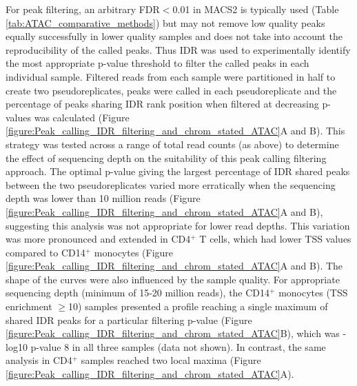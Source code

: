 For peak filtering, an arbitrary FDR$<$0.01 in MACS2 is typically used (Table \ref{tab:ATAC_comparative_methods}) but may not remove low quality peaks equally successfully in lower quality samples and does not take into account the reproducibility of the called peaks. Thus IDR was used to experimentally identify the most appropriate p-value threshold to filter the called peaks in each individual sample. Filtered reads from each sample were partitioned in half to create two pseudoreplicates, peaks were called in each pseudoreplicate and the percentage of peaks sharing IDR rank position when filtered at decreasing p-values was calculated (Figure \ref{figure:Peak_calling_IDR_filtering_and_chrom_stated_ATAC}A and B). This strategy was tested across a range of total read counts (as above) to determine the effect of sequencing depth on the suitability of this peak calling filtering approach. The optimal p-value giving the largest percentage of IDR shared peaks between the two pseudoreplicates varied more erratically when the sequencing depth was lower than 10 million reads (Figure \ref{figure:Peak_calling_IDR_filtering_and_chrom_stated_ATAC}A and B), suggesting this analysis was not appropriate for lower read depths. This variation was more pronounced and extended in CD4$^+$ T cells, which had lower TSS values compared to CD14$^+$ monocytes (Figure \ref{figure:Peak_calling_IDR_filtering_and_chrom_stated_ATAC}A and B). The shape of the curves were also influenced by the sample quality. For appropriate sequencing depth (minimum of 15-20 million reads), the CD14$^+$ monocytes (TSS enrichment $\geq$10) samples presented a profile reaching a single maximum of shared IDR peaks for a particular filtering p-value (Figure \ref{figure:Peak_calling_IDR_filtering_and_chrom_stated_ATAC}B), which was -log10 p-value 8 in all three samples (data not shown). In contrast, the same analysis in CD4$^+$ samples reached two local maxima (Figure \ref{figure:Peak_calling_IDR_filtering_and_chrom_stated_ATAC}A). 



